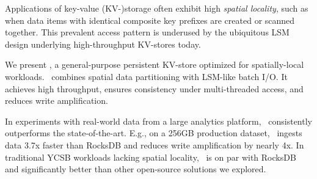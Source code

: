 Applications of key-value (KV-)storage often exhibit high \emph{spatial locality}, such as  
when data items with identical composite key prefixes are created or scanned together.  
This prevalent access pattern is underused by the ubiquitous LSM  design underlying 
high-throughput KV-stores today.

We present \sys, a general-purpose persistent KV-store optimized for spatially-local %
workloads. 
\sys\ combines spatial data partitioning with LSM-like  batch I/O. 
It achieves high throughput, 
ensures consistency under multi-threaded access,   
and reduces write amplification. 

In experiments with real-world data from a large analytics platform,  \sys\  
consistently outperforms the state-of-the-art. E.g., on a 256GB production dataset, 
\sys\ ingests data 3.7x faster than RocksDB  %
and reduces write amplification by nearly 4x. 
In traditional YCSB workloads lacking spatial locality, %
\sys\ is on par with RocksDB and significantly better than other open-source solutions we explored.
